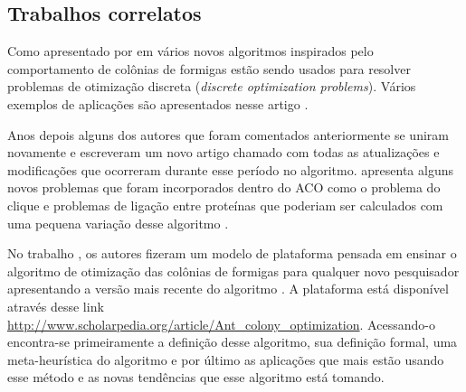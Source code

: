 \subsection{Trabalhos correlatos}

Como apresentado por \citeauthor{ACO_New_Algorithm} em  vários
novos algoritmos inspirados pelo comportamento de colônias de formigas estão sendo usados 
para resolver problemas de otimização discreta (\emph{discrete optimization problems}). Vários
exemplos de aplicações são apresentados nesse artigo \cite{ACO_New_Algorithm}.

Anos depois alguns dos autores que foram comentados anteriormente se uniram novamente e
escreveram um novo artigo chamado  com todas as atualizações 
e modificações que ocorreram durante esse período no algoritmo. \citeauthor{UpdatesInACO} apresenta
alguns novos problemas que foram incorporados dentro do ACO como o problema do clique e problemas
de ligação entre proteínas que poderiam ser calculados com uma pequena variação desse algoritmo
\cite{UpdatesInACO}.

No trabalho , os autores \citeauthor{ACO_New_Algorithm_20anos}
fizeram um modelo de plataforma pensada em ensinar o algoritmo de otimização das colônias de formigas 
para qualquer novo pesquisador apresentando a versão mais recente do algoritmo \cite{ACO_New_Algorithm_20anos}. 
A plataforma está disponível através desse link \url{http://www.scholarpedia.org/article/Ant_colony_optimization}.
Acessando-o encontra-se primeiramente a definição desse algoritmo, sua definição formal, uma meta-heurística
do algoritmo e por último as aplicações que mais estão usando esse método e as novas tendências que 
esse algoritmo está tomando.
